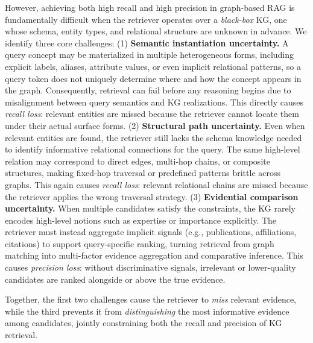 However, achieving both high recall and high precision in graph-based RAG is fundamentally difficult when the retriever operates over a \emph{black-box} KG, one whose schema, entity types, and relational structure are unknown in advance. We identify three core challenges:
(1) \textbf{Semantic instantiation uncertainty.} A query concept may be materialized in multiple heterogeneous forms, including explicit labels, aliases, attribute values, or even implicit relational patterns, so a query token does not uniquely determine where and how the concept appears in the graph. Consequently, retrieval can fail before any reasoning begins due to misalignment between query semantics and KG realizations. This directly causes \emph{recall loss}: relevant entities are missed because the retriever cannot locate them under their actual surface forms.
(2) \textbf{Structural path uncertainty.} Even when relevant entities are found, the retriever still lacks the schema knowledge needed to identify informative relational connections for the query. The same high-level relation may correspond to direct edges, multi-hop chains, or composite structures, making fixed-hop traversal or predefined patterns brittle across graphs. This again causes \emph{recall loss}: relevant relational chains are missed because the retriever applies the wrong traversal strategy.
(3) \textbf{Evidential comparison uncertainty.} When multiple candidates satisfy the constraints, the KG rarely encodes high-level notions such as expertise or importance explicitly. The retriever must instead aggregate implicit signals (e.g., publications, affiliations, citations) to support query-specific ranking, turning retrieval from graph matching into multi-factor evidence aggregation and comparative inference. This causes \emph{precision loss}: without discriminative signals, irrelevant or lower-quality candidates are ranked alongside or above the true evidence.

Together, the first two challenges cause the retriever to \emph{miss} relevant evidence, while the third prevents it from \emph{distinguishing} the most informative evidence among candidates, jointly constraining both the recall and precision of KG retrieval.

